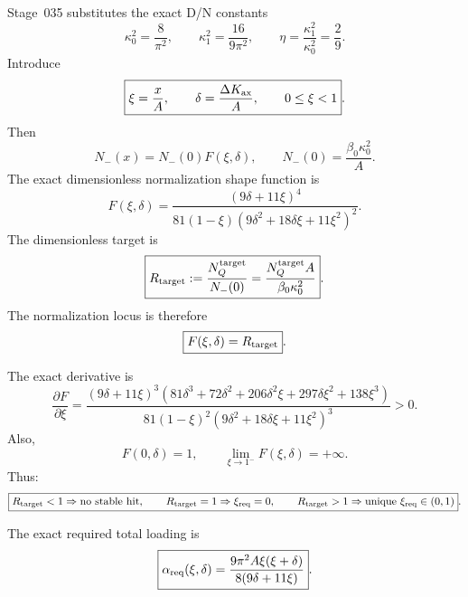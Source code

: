 Stage~035 substitutes the exact D/N constants
\begin{equation}
\label{eq:part02-DN-constants}
\boxed{
\kappa_0^2=\frac{8}{\pi^2},
\qquad
\kappa_1^2=\frac{16}{9\pi^2},
\qquad
\eta=\frac{\kappa_1^2}{\kappa_0^2}=\frac29}.
\end{equation}
Introduce
\begin{equation}
\label{eq:part02-xi-delta}
\boxed{
\xi=\frac{x}{A},
\qquad
\delta=\frac{\Delta K_{\rm ax}}{A},
\qquad
0\leq\xi<1}.
\end{equation}
Then
\begin{equation}
N_-(x)=N_-(0)F(\xi,\delta),
\qquad
N_-(0)=\frac{\beta_0\kappa_0^2}{A}.
\end{equation}
The exact dimensionless normalization shape function is
\begin{equation}
\label{eq:part02-F-function}
\boxed{
F(\xi,\delta)
=
\frac{(9\delta+11\xi)^4}
{81(1-\xi)(9\delta^2+18\delta\xi+11\xi^2)^2}}.
\end{equation}
The dimensionless target is
\begin{equation}
\label{eq:part02-Rtarget}
\boxed{
R_{\rm target}
:=
\frac{N_Q^{\rm target}}{N_-(0)}
=
\frac{N_Q^{\rm target}A}{\beta_0\kappa_0^2}}.
\end{equation}
The normalization locus is therefore
\begin{equation}
\label{eq:part02-F-locus}
\boxed{
F(\xi,\delta)=R_{\rm target}}.
\end{equation}

The exact derivative is
\begin{equation}
\label{eq:part02-F-derivative}
\frac{\partial F}{\partial\xi}
=
\frac{(9\delta+11\xi)^3
\left(81\delta^3+72\delta^2+206\delta^2\xi+297\delta\xi^2+138\xi^3\right)}
{81(1-\xi)^2(9\delta^2+18\delta\xi+11\xi^2)^3}>0.
\end{equation}
Also,
\begin{equation}
F(0,\delta)=1,
\qquad
\lim_{\xi\to1^-}F(\xi,\delta)=+\infty.
\end{equation}
Thus:
\begin{equation}
\label{eq:part02-F-existence}
\boxed{
R_{\rm target}<1 \Rightarrow \text{no stable hit},
\qquad
R_{\rm target}=1 \Rightarrow \xi_{\rm req}=0,
\qquad
R_{\rm target}>1 \Rightarrow \text{unique }\xi_{\rm req}\in(0,1)}.
\end{equation}

The exact required total loading is
\begin{equation}
\label{eq:part02-alpha-req}
\boxed{
\alpha_{\rm req}(\xi,\delta)
=
\frac{9\pi^2A\xi(\xi+\delta)}{8(9\delta+11\xi)}}.
\end{equation}

